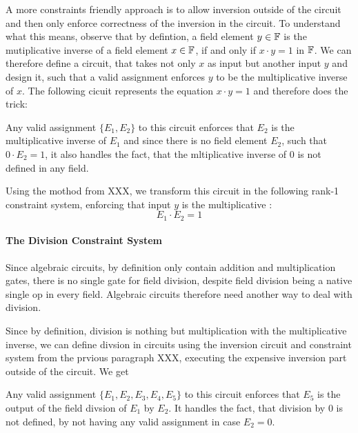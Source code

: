 A more constraints friendly approach is to allow inversion outside of the circuit and then only enforce correctness of the inversion in the circuit. To understand what this means, observe that by defintion, a field element $y\in \mathbb{F}$ is the mutiplicative inverse of a field element $x\in \mathbb{F}$, if and only if $x\cdot y =1$ in $\mathbb{F}$. We can therefore define a circuit, that takes not only $x$ as input but another input $y$ and design it, such that a valid assignment enforces $y$ to be the multiplicative inverse of $x$. The following cicuit represents the equation $x\cdot y =1$ and therefore does the trick:
\begin{center}
\end{center}
Any valid assignment $\{E_1,E_2\}$ to this circuit enforces that $E_2$ is the multiplicative inverse of $E_1$ and since there is no field element $E_2$, such that $0\cdot E_2=1$, it also handles the fact, that the mltiplicative inverse of $0$ is not defined in any field.

Using the mothod from XXX, we transform this circuit in the following rank-1 constraint system, enforcing that input $y$ is the multiplicative :
\begin{equation}
E_1 \cdot E_2 = 1
\end{equation}
\paragraph{The Division Constraint System} Since algebraic circuits, by definition only contain addition and multiplication gates, there is no single gate for field division, despite field division being a native single op in every field. Algebraic circuits therefore need another way to deal with division.

Since by definition, division is nothing but multiplication with the multiplicative inverse, we can define divsion in circuits using the inversion circuit and constraint system from the prvious paragraph XXX, executing the expensive inversion part outside of the circuit. We get 
\begin{center}
\end{center} 
Any valid assignment $\{E_1,E_2,E_3,E_4,E_5\}$ to this circuit enforces that $E_5$ is the output of the field divsion of $E_1$ by $E_2$. It handles the fact, that division by $0$ is not defined, by not having any valid assignment in case $E_2=0$.

